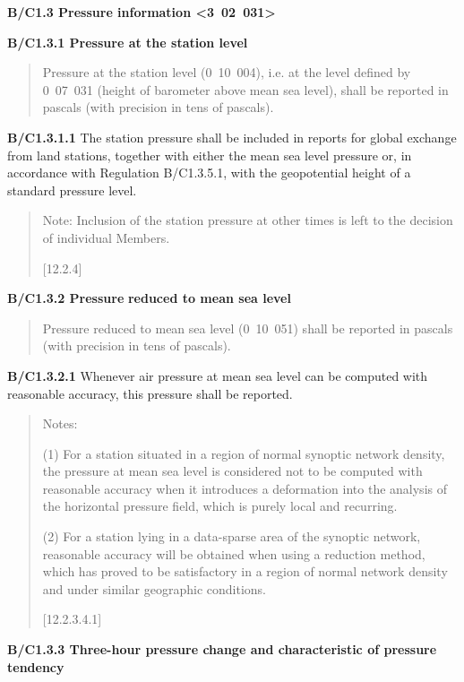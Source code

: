 \textbf{B/C1.3 Pressure information \textless3~02~031\textgreater{}}

\textbf{B/C1.3.1 Pressure at the station level}

\begin{quote}
Pressure at the station level (0~10~004), i.e. at the level defined by 0~07~031 (height of barometer above mean sea level), shall be reported in pascals (with precision in tens of pascals).
\end{quote}

\textbf{B/C1.3.1.1} The station pressure shall be included in reports for global exchange from land stations, together with either the mean sea level pressure or, in accordance with Regulation B/C1.3.5.1, with the geopotential height of a standard pressure level.

\begin{quote}
Note: Inclusion of the station pressure at other times is left to the decision of individual Members.

{[}12.2.4{]}
\end{quote}

\textbf{B/C1.3.2 Pressure} \textbf{reduced to mean sea level}

\begin{quote}
Pressure reduced to mean sea level (0~10~051) shall be reported in pascals (with precision in tens of pascals).
\end{quote}

\textbf{B/C1.3.2.1} Whenever air pressure at mean sea level can be computed with reasonable accuracy, this pressure shall be reported.

\begin{quote}
Notes:

(1) For a station situated in a region of normal synoptic network density, the pressure at mean sea level is considered not to be computed with reasonable accuracy when it introduces a deformation into the analysis of the horizontal pressure field, which is purely local and recurring.

(2) For a station lying in a data-sparse area of the synoptic network, reasonable accuracy will be obtained when using a reduction method, which has proved to be satisfactory in a region of normal network density and under similar geographic conditions.

{[}12.2.3.4.1{]}
\end{quote}

\textbf{B/C1.3.3 Three-hour pressure change and characteristic of pressure tendency}

